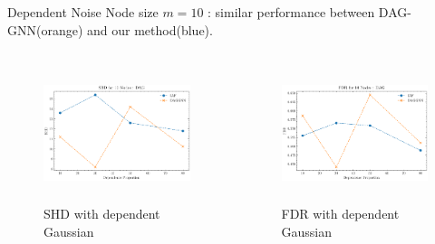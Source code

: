 \documentclass{beamer}
\begin{document}
\begin{frame}[allowframebreaks]{Dependent Noise}
    Node size $m=10$ : similar performance between DAG-GNN(orange) and our method(blue).
    \begin{columns}
        \begin{column}{0.5\textwidth}
            \begin{figure}
                \centering
                \includegraphics[height=4cm]{fig/SHD_dependence_10_DAG_threshold0.3.pdf}
                \caption{SHD with dependent Gaussian}
                \label{fig:dep_gaussian_shd_10}
            \end{figure}
        \end{column}
        \begin{column}{0.5\textwidth}
            \begin{figure}
                \centering
                \includegraphics[height=4cm]{fig/FDR_dependence_10_DAG_threshold0.3.pdf}
                \caption{FDR with dependent Gaussian}
                \label{fig:dep_gaussian_fdr_10}
            \end{figure}
        \end{column}
    \end{columns}


\end{frame}
\end{document}
